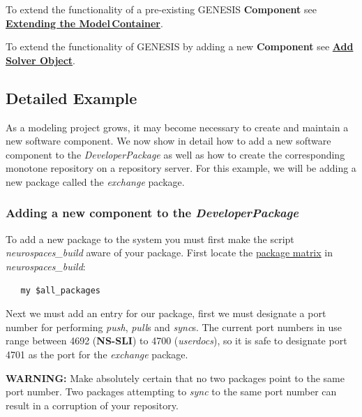 \documentclass[12pt]{article}
\begin{document}
To extend the functionality of a pre-existing GENESIS {\bf Component} see \href{../genesis-extend-model-container/genesis-extend-model-container.tex}{\bf Extending the Model\,Container}.

To extend the functionality of GENESIS by adding a new {\bf Component} see \href{../genesis-add-object-solver/genesis-add-object-solver.tex}{\bf Add Solver Object}.

\subsection*{Detailed Example}

As a modeling project grows, it may become necessary to create and maintain a new software component. We now show in detail how to add a new software component to the {\it DeveloperPackage} as well as how to create the corresponding monotone repository on a repository server. For this example, we will be adding a new package called the {\it exchange} package.

\subsubsection*{Adding a new component to the {\it DeveloperPackage}}

To add a new package to the system you must first make the script {\it neurospaces\_build} aware of your package. First locate the \href{../developer-package/developer-package.tex}{package matrix} in {\it neurospaces\_build}:
\begin{verbatim}
   my $all_packages
\end{verbatim}
Next we must add an entry for our package, first we must designate a port number for performing {\it push}, {\it pull}s and {\it sync}s. The current port numbers in use range between 4692 ({\bf NS-SLI}) to 4700 ({\it userdocs}), so it is safe to designate port 4701 as the port for the {\it exchange} package.

{\bf WARNING:} Make absolutely certain that no two packages point to the same port number. Two packages attempting to {\it sync} to the same port number can result in a corruption of your repository.
\end{document}
